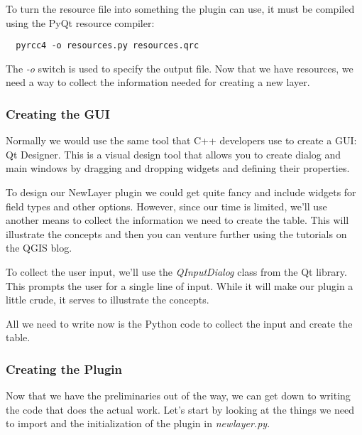 To turn the resource file into something the plugin can use, it must be 
compiled using the PyQt resource compiler:

\begin{verbatim}
  pyrcc4 -o resources.py resources.qrc
\end{verbatim}

The \textsl{-o} switch is used to specify the output file. Now that we 
have resources, we need a way to collect the information needed for creating 
a new layer.

\subsubsection{Creating the GUI}

Normally we would use the same tool that C++ developers use to create a 
GUI: Qt Designer. This is a visual design tool that allows you to create 
dialog and main windows by dragging and dropping widgets and defining 
their properties.

To design our NewLayer plugin we could get quite fancy and include widgets 
for field types and other options. However, since our time is limited, we'll 
use another means to collect the information we need to create the table. 
This will illustrate the concepts and then you can venture further using the 
tutorials on the QGIS blog.

To collect the user input, we'll use the \textsl{QInputDialog} class from
the Qt library.  This prompts the user for a single line of input. While it
will make our plugin a little crude, it serves to illustrate the concepts.

All we need to write now is the Python code to collect the input and create 
the table.

\subsubsection{Creating the Plugin}

Now that we have the preliminaries out of the way, we can get down to writing
the code that does the actual work.  Let's start by looking at the things we
need to import and the initialization of the plugin in \textsl{newlayer.py}.
 
